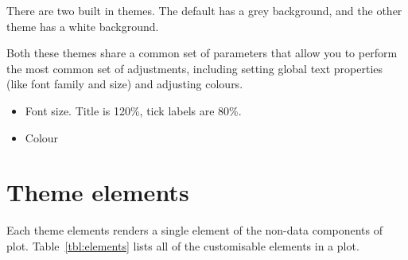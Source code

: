 There are two built in themes.  The default has a grey background, and the other theme has a white background.

Both these themes share a common set of parameters that allow you to perform the most common set of adjustments, including setting global text properties (like font family and size) and adjusting colours.  

\begin{itemize}
  \item Font size.  Title is 120\%, tick labels are 80\%.
  \item Colour
\end{itemize}

% 

\section{Theme elements}
\label{sec:theme_elements}

Each theme elements renders a single element of the non-data components of plot.  Table~\ref{tbl:elements} lists all of the customisable elements in a plot.

